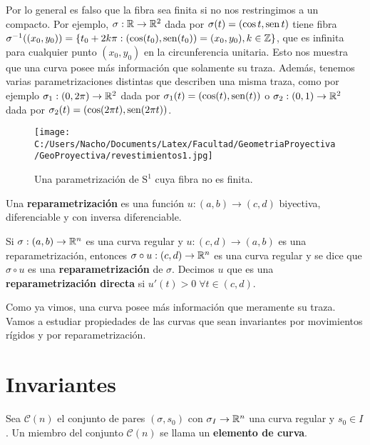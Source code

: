 \begin{ex}
Por lo general es falso que la fibra sea finita si no nos restringimos a un compacto. Por ejemplo, $\sigma:\mathbb{R}\to\mathbb{R}^2$ dada por $\sigma(t)=(\cos t,\operatorname{sen} t)$ tiene fibra $\sigma^{-1}((x_0,y_0)) = \{t_0 + 2k\pi : (\cos(t_0),\operatorname{sen}(t_0))=(x_0,y_0), k\in\mathbb{Z}\}$, que es infinita para cualquier punto $(x_0,y_0)$ en la circunferencia unitaria. Esto nos muestra que una curva posee más información que solamente su traza. Además, tenemos varias parametrizaciones distintas que describen una misma traza, como por ejemplo $\sigma_1:(0,2\pi)\to \mathbb{R}^2$ dada por $\sigma_1(t)=(\cos(t),\operatorname{sen}(t))$ o $\sigma_2:(0,1)\to \mathbb{R}^2$ dada por $\sigma_2(t)=(\cos(2\pi t),\operatorname{sen}(2\pi t))$.
\begin{figure}[h]
	\centering
		\texttt{[image: C:/Users/Nacho/Documents/Latex/Facultad/GeometriaProyectiva/GeoProyectiva/revestimientos1.jpg]}
	\caption{Una parametrización de $\mathrm{S}^1$ cuya fibra no es finita.}
	\label{fig:revestimientos1}
\end{figure}
\end{ex}

\begin{defn}
Una \textbf{reparametrización} es una función $u:(a,b)\to (c,d)$ biyectiva, diferenciable y con inversa diferenciable.
\end{defn}

\begin{defn}
Si $\sigma:(a,b)\to\mathbb{R}^n$ es una curva regular y $u:(c,d)\to (a,b)$ es una reparametrización, entonces $\sigma\circ u:(c,d)\to\mathbb{R}^n$ es una curva regular y se dice que $\sigma\circ u$ es una \textbf{reparametrización} de $\sigma$. Decimos $u$ que es una \textbf{reparametrización directa} si $u'(t)>0 \;\forall t\in (c,d)$.
\end{defn}

Como ya vimos, una curva posee más información que meramente su traza. Vamos a estudiar propiedades de las curvas que sean invariantes por movimientos rígidos y por reparametrización.

\section{Invariantes}

\begin{defn}
Sea $\mathscr{C}(n)$ el conjunto de pares $(\sigma,s_0)$ con $\sigma_I\to\mathbb{R}^n$ una curva regular y $s_0\in I$. Un miembro del conjunto $\mathscr{C}(n)$ se llama un \textbf{elemento de curva}.
\end{defn}

